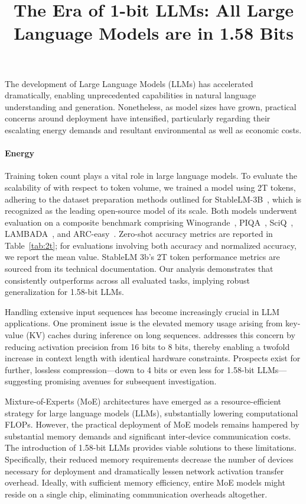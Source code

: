\title{The Era of 1-bit LLMs: All Large Language Models are in 1.58 Bits}
The development of Large Language Models (LLMs) has accelerated dramatically, enabling unprecedented capabilities in natural language understanding and generation. Nonetheless, as model sizes have grown, practical concerns around deployment have intensified, particularly regarding their escalating energy demands and resultant environmental as well as economic costs.

\paragraph{Energy}

Training token count plays a vital role in large language models. To evaluate the scalability of  with respect to token volume, we trained a  model using 2T tokens, adhering to the dataset preparation methods outlined for StableLM-3B~\cite{StableLM-3B-4E1T}, which is recognized as the leading open-source model of its scale. Both models underwent evaluation on a composite benchmark comprising Winogrande~\cite{winoGrande}, PIQA~\cite{piqa}, SciQ~\cite{sciq}, LAMBADA~\cite{lambada}, and ARC-easy~\cite{arc}. Zero-shot accuracy metrics are reported in Table~\ref{tab:2t}; for evaluations involving both accuracy and normalized accuracy, we report the mean value. StableLM 3b's 2T token performance metrics are sourced from its technical documentation. Our analysis demonstrates that  consistently outperforms across all evaluated tasks, implying robust generalization for 1.58-bit LLMs.

Handling extensive input sequences has become increasingly crucial in LLM applications. One prominent issue is the elevated memory usage arising from key-value (KV) caches during inference on long sequences.  addresses this concern by reducing activation precision from 16 bits to 8 bits, thereby enabling a twofold increase in context length with identical hardware constraints. Prospects exist for further, lossless compression—down to 4 bits or even less for 1.58-bit LLMs—suggesting promising avenues for subsequent investigation.

Mixture-of-Experts (MoE) architectures have emerged as a resource-efficient strategy for large language models (LLMs), substantially lowering computational FLOPs. However, the practical deployment of MoE models remains hampered by substantial memory demands and significant inter-device communication costs. The introduction of 1.58-bit LLMs provides viable solutions to these limitations. Specifically, their reduced memory requirements decrease the number of devices necessary for deployment and dramatically lessen network activation transfer overhead. Ideally, with sufficient memory efficiency, entire MoE models might reside on a single chip, eliminating communication overheads altogether.

